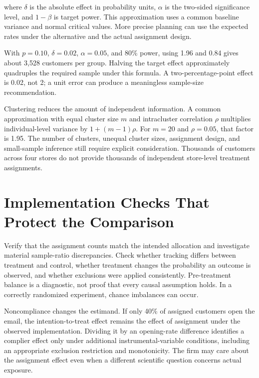 where \(\delta\) is the absolute effect in probability units, \(\alpha\)
is the two-sided significance level, and \(1-\beta\) is target power.
This approximation uses a common baseline variance and normal critical
values. More precise planning can use the expected rates under the
alternative and the actual assignment design.

With \(p=0.10\), \(\delta=0.02\), \(\alpha=0.05\), and 80\% power, using
1.96 and 0.84 gives about 3,528 customers per group. Halving the target
effect approximately quadruples the required sample under this formula.
A two-percentage-point effect is 0.02, not 2; a unit error can produce a
meaningless sample-size recommendation.

Clustering reduces the amount of independent information. A common
approximation with equal cluster size \(m\) and intracluster correlation
\(\rho\) multiplies individual-level variance by \(1+(m-1)\rho\). For
\(m=20\) and \(\rho=0.05\), that factor is 1.95. The number of clusters,
unequal cluster sizes, assignment design, and small-sample inference
still require explicit consideration. Thousands of customers across four
stores do not provide thousands of independent store-level treatment
assignments.

\hypertarget{M06-implementation-checks-that-protect-the-comparison}{%
\section{Implementation Checks That Protect the
Comparison}\label{M06-implementation-checks-that-protect-the-comparison}}

\noindent Verify that the assignment counts match the intended allocation and
investigate material sample-ratio discrepancies. Check whether tracking
differs between treatment and control, whether treatment changes the
probability an outcome is observed, and whether exclusions were applied
consistently. Pre-treatment balance is a diagnostic, not proof that
every causal assumption holds. In a correctly randomized experiment,
chance imbalances can occur.

Noncompliance changes the estimand. If only 40\% of assigned customers
open the email, the intention-to-treat effect remains the effect of
assignment under the observed implementation. Dividing it by an
opening-rate difference identifies a complier effect only under
additional instrumental-variable conditions, including an appropriate
exclusion restriction and monotonicity. The firm may care about the
assignment effect even when a different scientific question concerns
actual exposure.

